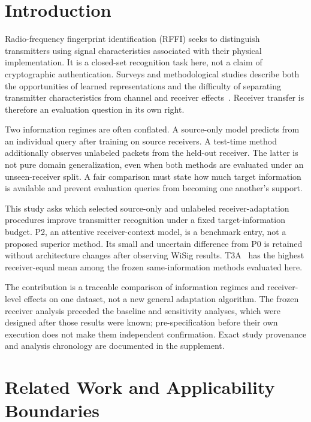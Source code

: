 \section{Introduction}
Radio-frequency fingerprint identification (RFFI) seeks to distinguish transmitters using signal characteristics associated with their physical implementation. It is a closed-set recognition task here, not a claim of cryptographic authentication. Surveys and methodological studies describe both the opportunities of learned representations and the difficulty of separating transmitter characteristics from channel and receiver effects~\cite{rffsurvey,rfmethodology,rfchallenges}. Receiver transfer is therefore an evaluation question in its own right.

Two information regimes are often conflated. A source-only model predicts from an individual query after training on source receivers. A test-time method additionally observes unlabeled packets from the held-out receiver. The latter is not pure domain generalization, even when both methods are evaluated under an unseen-receiver split. A fair comparison must state how much target information is available and prevent evaluation queries from becoming one another's support.

This study asks which selected source-only and unlabeled receiver-adaptation procedures improve transmitter recognition under a fixed target-information budget. P2, an attentive receiver-context model, is a benchmark entry, not a proposed superior method. Its small and uncertain difference from P0 is retained without architecture changes after observing WiSig results. T3A~\cite{t3a} has the highest receiver-equal mean among the frozen same-information methods evaluated here.

The contribution is a traceable comparison of information regimes and receiver-level effects on one dataset, not a new general adaptation algorithm. The frozen receiver analysis preceded the baseline and sensitivity analyses, which were designed after those results were known; pre-specification before their own execution does not make them independent confirmation. Exact study provenance and analysis chronology are documented in the supplement.

\section{Related Work and Applicability Boundaries}
